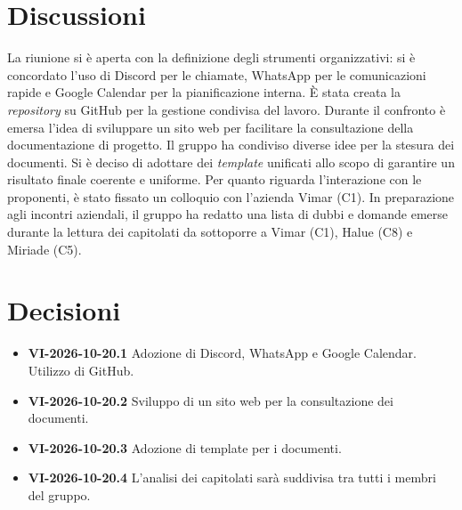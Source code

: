 \documentclass[11pt, a4paper]{article}
\begin{document}
\section{Discussioni}
La riunione si è aperta con la definizione degli strumenti organizzativi: si è concordato l'uso di Discord per le chiamate, WhatsApp per le comunicazioni rapide e Google Calendar per la pianificazione interna. È stata creata la \textit{repository} su GitHub per la gestione condivisa del lavoro. Durante il confronto è emersa l'idea di sviluppare un sito web per facilitare la consultazione della documentazione di progetto. \newline
Il gruppo ha condiviso diverse idee per la stesura dei documenti. Si è deciso di adottare dei \textit{template} unificati allo scopo di garantire un risultato finale coerente e uniforme. \newline
Per quanto riguarda l'interazione con le proponenti, è stato fissato un colloquio con l'azienda Vimar (C1). In preparazione agli incontri aziendali, il gruppo ha redatto una lista di dubbi e domande emerse durante la lettura dei capitolati da sottoporre a Vimar (C1), Halue (C8) e Miriade (C5).

\section{Decisioni}
\begin{itemize}
    \item \textbf{VI-2026-10-20.1} Adozione di Discord, WhatsApp e Google Calendar. Utilizzo di GitHub.
    \item \textbf{VI-2026-10-20.2} Sviluppo di un sito web per la consultazione dei documenti.
    \item \textbf{VI-2026-10-20.3} Adozione di template per i documenti.
    \item \textbf{VI-2026-10-20.4} L'analisi dei capitolati sarà suddivisa tra tutti i membri del gruppo.  
\end{itemize}
\end{document}
